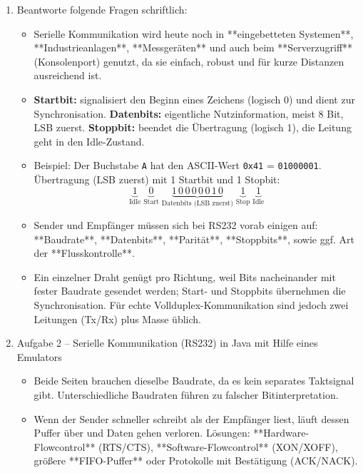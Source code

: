 \documentclass[11pt,a4paper,oneside]{article}
\newcounter{loesung}[section]
\renewcommand{\theloesung}{\thesection.\arabic{loesung}}
\newenvironment{loesung}[1]{%
	\refstepcounter{loesung}%
	\begin{tcolorbox}[termbase,
		colframe=loesungColor!50!black,
		boxed title style={interior style={left color=loesungColor, right color=loesungColor!70!black}},
		title={Lösung~\theloesung: #1}]%
	}{\end{tcolorbox}}
\begin{document}
	\begin{loesung}{Serielle Kommunikation}
		\begin{enumerate}
			\item Beantworte folgende Fragen schriftlich:
			\begin{itemize}
				\item Serielle Kommunikation wird heute noch in **eingebetteten Systemen**, **Industrieanlagen**, **Messgeräten** und auch beim **Serverzugriff** (Konsolenport) genutzt, da sie einfach, robust und für kurze Distanzen ausreichend ist.
				
				\item \textbf{Startbit:} signalisiert den Beginn eines Zeichens (logisch 0) und dient zur Synchronisation. 
				\textbf{Datenbits:} eigentliche Nutzinformation, meist 8 Bit, LSB zuerst.
				\textbf{Stoppbit:} beendet die Übertragung (logisch 1), die Leitung geht in den Idle-Zustand.
				
				\item Beispiel: Der Buchstabe \texttt{A} hat den ASCII-Wert \texttt{0x41} = \texttt{01000001}. 
				Übertragung (LSB zuerst) mit 1 Startbit und 1 Stopbit: 
				\[
				\underbrace{1}_{\text{Idle}} \;
				\underbrace{0}_{\text{Start}} \;
				\underbrace{1\,0\,0\,0\,0\,0\,1\,0}_{\text{Datenbits (LSB zuerst)}} \;
				\underbrace{1}_{\text{Stop}} \;
				\underbrace{1}_{\text{Idle}}
				\]
				
				\item Sender und Empfänger müssen sich bei RS232 vorab einigen auf: **Baudrate**, **Datenbits**, **Parität**, **Stoppbits**, sowie ggf. Art der **Flusskontrolle**.
				
				\item Ein einzelner Draht genügt pro Richtung, weil Bits nacheinander mit fester Baudrate gesendet werden; Start- und Stoppbits übernehmen die Synchronisation. Für echte Vollduplex-Kommunikation sind jedoch zwei Leitungen (Tx/Rx) plus Masse üblich.
			\end{itemize}
			
			\item Aufgabe 2 – Serielle Kommunikation (RS232) in Java mit Hilfe eines Emulators
			\begin{itemize}
				\item Beide Seiten brauchen dieselbe Baudrate, da es kein separates Taktsignal gibt. Unterschiedliche Baudraten führen zu falscher Bitinterpretation.
				
				\item Wenn der Sender schneller schreibt als der Empfänger liest, läuft dessen Puffer über und Daten gehen verloren. 
				Lösungen: **Hardware-Flowcontrol** (RTS/CTS), **Software-Flowcontrol** (XON/XOFF), größere **FIFO-Puffer** oder Protokolle mit Bestätigung (ACK/NACK).
			\end{itemize}
		\end{enumerate}
	\end{loesung}
	
\end{document}
